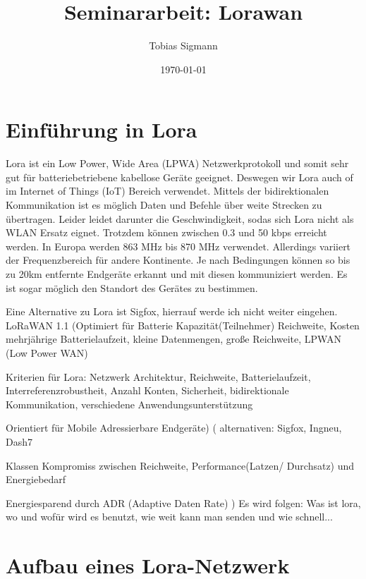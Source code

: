 \documentclass[a4paper,12pt]{article}
\author{Tobias Sigmann}
\title{Seminararbeit: Lorawan}
\date{\today}
\begin{document}
    \maketitle
    \newpage
    \tableofcontents
    \newpage

    \section{Einführung in Lora}
        Lora ist ein Low Power, Wide Area (LPWA) Netzwerkprotokoll und somit sehr gut für batteriebetriebene kabellose Geräte geeignet. Deswegen wir Lora auch of im Internet of Things (IoT) Bereich verwendet.
        Mittels der bidirektionalen Kommunikation ist es möglich Daten und Befehle über weite Strecken zu übertragen. Leider leidet darunter die Geschwindigkeit, sodas sich Lora nicht als WLAN Ersatz eignet.
        Trotzdem können zwischen 0.3 und 50 kbps erreicht werden. In Europa werden 863 MHz bis 870 MHz verwendet. Allerdings variiert der Frequenzbereich für andere Kontinente. Je nach Bedingungen können so bis zu 20km entfernte Endgeräte erkannt und mit diesen kommuniziert werden.
        Es ist sogar möglich den Standort des Gerätes zu bestimmen.
        
        Eine Alternative zu Lora ist Sigfox, hierrauf werde ich nicht weiter eingehen.
        LoRaWAN 1.1
        \newline    
        \cite{WhatIsLoRa}(Optimiert für Batterie Kapazität(Teilnehmer) Reichweite, Kosten
        mehrjährige Batterielaufzeit, kleine Datenmengen, große Reichweite, LPWAN (Low Power WAN)
        
        Kriterien für Lora: Netzwerk Architektur, Reichweite, Batterielaufzeit, Interreferenzrobustheit, Anzahl Konten, Sicherheit, bidirektionale Kommunikation, verschiedene Anwendungsunterstützung
        
        Orientiert für Mobile Adressierbare Endgeräte)
        \newline{}
            \cite{LoraLimit}(
                alternativen: Sigfox, Ingneu, Dash7

                Klassen Kompromiss zwischen Reichweite, Performance(Latzen/ Durchsatz) und Energiebedarf

                Energiesparend durch ADR (Adaptive Daten Rate)
            )
        \newline{}\newline{} Es wird folgen: Was ist lora, wo und wofür wird es benutzt, wie weit kann man senden und wie schnell...
    \section{Aufbau eines Lora-Netzwerk}
    
\end{document}
